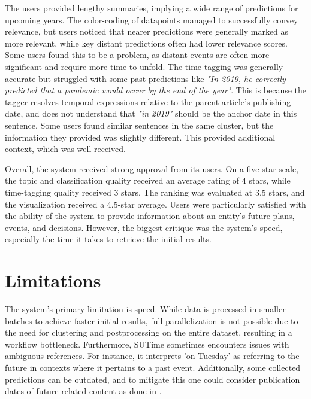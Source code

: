 \documentclass[a4paper,10pt]{report} %
\begin{document}
The users provided lengthy summaries, implying a wide range of predictions for upcoming years. The color-coding of datapoints managed to successfully convey relevance, but users noticed that nearer predictions were generally marked as more relevant, while key distant predictions often had lower relevance scores. Some users found this to be a problem, as distant events are often more significant and require more time to unfold. The time-tagging was generally accurate but struggled with some past predictions like \textit{"In 2019, he correctly predicted that a pandemic would occur by the end of the year"}. This is because the tagger resolves temporal expressions relative to the parent article's publishing date, and does not understand that \textit{"in 2019"} should be the anchor date in this sentence. Some users found similar sentences in the same cluster, but the information they provided was slightly different. This provided additional context, which was well-received.

Overall, the system received strong approval from its users. On a five-star scale, the topic and classification quality received an average rating of 4 stars, while time-tagging quality received 3 stars. The ranking was evaluated at 3.5 stars, and the visualization received a 4.5-star average. Users were particularly satisfied with the ability of the system to provide information about an entity's future plans, events, and decisions. However, the biggest critique was the system's speed, especially the time it takes to retrieve the initial results. 

\section{Limitations}
The system's primary limitation is speed. While data is processed in smaller batches to achieve faster initial results, full parallelization is not possible due to the need for clustering and postprocessing on the entire dataset, resulting in a workflow bottleneck. 
Furthermore, SUTime sometimes encounters issues with ambiguous references. For instance, it interprets 'on Tuesday' as referring to the future in contexts where it pertains to a past event. 
Additionally, some collected predictions can be outdated, and to mitigate this one could consider publication dates of future-related content as done in \cite{yusuke}. 
\end{document}
